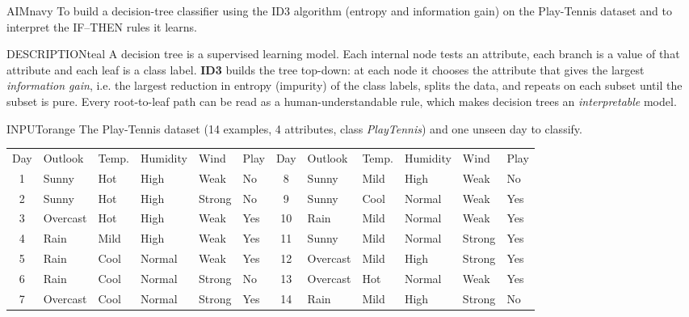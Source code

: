 \documentclass[11pt,a4paper]{article}
\newenvironment{aim}{\begin{secbox}{AIM}{navy}}{\end{secbox}}
\newenvironment{descr}{\begin{secbox}{DESCRIPTION}{teal}}{\end{secbox}}
\newenvironment{inputbox}{\begin{secbox}{INPUT}{orange}}{\end{secbox}}
\begin{document}
\begin{aim}
To build a decision-tree classifier using the ID3 algorithm (entropy and information gain) on the Play-Tennis dataset and to interpret the IF--THEN rules it learns.
\end{aim}

\begin{descr}
A decision tree is a supervised learning model. Each internal node tests an attribute, each branch is a value of that attribute and each leaf is a class label. \textbf{ID3} builds the tree top-down: at each node it chooses the attribute that gives the largest \emph{information gain}, i.e. the largest reduction in entropy (impurity) of the class labels, splits the data, and repeats on each subset until the subset is pure. Every root-to-leaf path can be read as a human-understandable rule, which makes decision trees an \emph{interpretable} model.
\end{descr}

\begin{inputbox}
The Play-Tennis dataset (14 examples, 4 attributes, class \textit{PlayTennis}) and one unseen day to classify.
\begin{center}\sffamily\footnotesize
{}
\begin{tabular}{clllll@{\hskip 6mm}clllll}
\rowcolor{orange!30} Day & Outlook & Temp. & Humidity & Wind & Play & Day & Outlook & Temp. & Humidity & Wind & Play\\
1 & Sunny & Hot & High & Weak & No & 8 & Sunny & Mild & High & Weak & No\\
2 & Sunny & Hot & High & Strong & No & 9 & Sunny & Cool & Normal & Weak & Yes\\
3 & Overcast & Hot & High & Weak & Yes & 10 & Rain & Mild & Normal & Weak & Yes\\
4 & Rain & Mild & High & Weak & Yes & 11 & Sunny & Mild & Normal & Strong & Yes\\
5 & Rain & Cool & Normal & Weak & Yes & 12 & Overcast & Mild & High & Strong & Yes\\
6 & Rain & Cool & Normal & Strong & No & 13 & Overcast & Hot & Normal & Weak & Yes\\
7 & Overcast & Cool & Normal & Strong & Yes & 14 & Rain & Mild & High & Strong & No\\
\end{tabular}
\end{center}
\end{inputbox}
\end{document}
